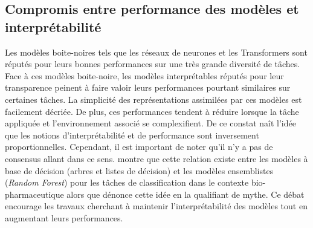 \documentclass{report}
\newenvironment{comb}
    {\begin{color}{olive}
    }
    { 
    \end{color}
    }
\begin{document}
    \subsection{Compromis entre performance des modèles et interprétabilité}
    
    
    Les modèles boite-noires tels que les réseaux de neurones et les Transformers sont réputés pour leurs bonnes performances sur une très grande diversité de tâches. Face à ces modèles boite-noire, les modèles interprétables réputés pour leur transparence peinent à faire valoir leurs performances pourtant similaires sur certaines tâches. La simplicité des représentations assimilées par ces modèles est facilement décriée. De plus, ces performances tendent à réduire lorsque la tâche appliquée et l'environnement associé se complexifient. De ce constat naît l'idée que les notions d'interprétabilité et de performance sont inversement proportionnelles. Cependant, il est important de noter qu'il n'y a pas de consensus allant dans ce sens. \cite{johansson_trade-off_2011} montre que cette relation existe entre les modèles à base de décision (arbres et listes de décision) et les modèles ensemblistes (\emph{Random Forest}) pour les tâches de classification dans le contexte bio-pharmaceutique alors que \cite{rudin_stop_2019} dénonce cette idée en la qualifiant de mythe. Ce débat encourage les travaux cherchant à maintenir l'interprétabilité des modèles tout en augmentant leurs performances. 
    
\end{document}
